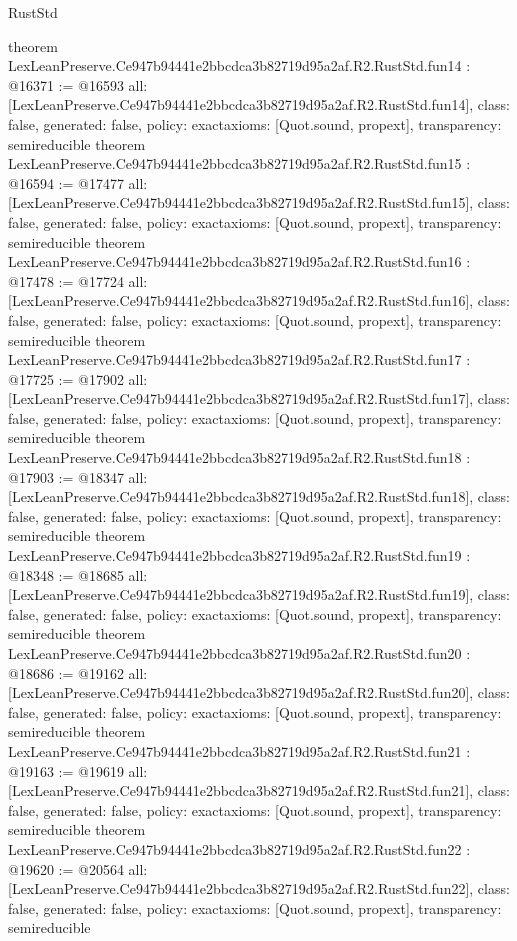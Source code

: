 \begin{lexlean}{RustStd}
\begin{coremodule}
{}
theorem LexLeanPreserve.Ce947b94441e2bbcdca3b82719d95a2af.R2.RustStd.fun14 : @16371 := @16593 {
  all: [LexLeanPreserve.Ce947b94441e2bbcdca3b82719d95a2af.R2.RustStd.fun14],
  class: false,
  generated: false,
  policy: exact{axioms: [Quot.sound, propext]},
  transparency: semireducible
}
theorem LexLeanPreserve.Ce947b94441e2bbcdca3b82719d95a2af.R2.RustStd.fun15 : @16594 := @17477 {
  all: [LexLeanPreserve.Ce947b94441e2bbcdca3b82719d95a2af.R2.RustStd.fun15],
  class: false,
  generated: false,
  policy: exact{axioms: [Quot.sound, propext]},
  transparency: semireducible
}
theorem LexLeanPreserve.Ce947b94441e2bbcdca3b82719d95a2af.R2.RustStd.fun16 : @17478 := @17724 {
  all: [LexLeanPreserve.Ce947b94441e2bbcdca3b82719d95a2af.R2.RustStd.fun16],
  class: false,
  generated: false,
  policy: exact{axioms: [Quot.sound, propext]},
  transparency: semireducible
}
theorem LexLeanPreserve.Ce947b94441e2bbcdca3b82719d95a2af.R2.RustStd.fun17 : @17725 := @17902 {
  all: [LexLeanPreserve.Ce947b94441e2bbcdca3b82719d95a2af.R2.RustStd.fun17],
  class: false,
  generated: false,
  policy: exact{axioms: [Quot.sound, propext]},
  transparency: semireducible
}
theorem LexLeanPreserve.Ce947b94441e2bbcdca3b82719d95a2af.R2.RustStd.fun18 : @17903 := @18347 {
  all: [LexLeanPreserve.Ce947b94441e2bbcdca3b82719d95a2af.R2.RustStd.fun18],
  class: false,
  generated: false,
  policy: exact{axioms: [Quot.sound, propext]},
  transparency: semireducible
}
theorem LexLeanPreserve.Ce947b94441e2bbcdca3b82719d95a2af.R2.RustStd.fun19 : @18348 := @18685 {
  all: [LexLeanPreserve.Ce947b94441e2bbcdca3b82719d95a2af.R2.RustStd.fun19],
  class: false,
  generated: false,
  policy: exact{axioms: [Quot.sound, propext]},
  transparency: semireducible
}
theorem LexLeanPreserve.Ce947b94441e2bbcdca3b82719d95a2af.R2.RustStd.fun20 : @18686 := @19162 {
  all: [LexLeanPreserve.Ce947b94441e2bbcdca3b82719d95a2af.R2.RustStd.fun20],
  class: false,
  generated: false,
  policy: exact{axioms: [Quot.sound, propext]},
  transparency: semireducible
}
theorem LexLeanPreserve.Ce947b94441e2bbcdca3b82719d95a2af.R2.RustStd.fun21 : @19163 := @19619 {
  all: [LexLeanPreserve.Ce947b94441e2bbcdca3b82719d95a2af.R2.RustStd.fun21],
  class: false,
  generated: false,
  policy: exact{axioms: [Quot.sound, propext]},
  transparency: semireducible
}
theorem LexLeanPreserve.Ce947b94441e2bbcdca3b82719d95a2af.R2.RustStd.fun22 : @19620 := @20564 {
  all: [LexLeanPreserve.Ce947b94441e2bbcdca3b82719d95a2af.R2.RustStd.fun22],
  class: false,
  generated: false,
  policy: exact{axioms: [Quot.sound, propext]},
  transparency: semireducible
}
\end{coremodule}
\end{lexlean}
